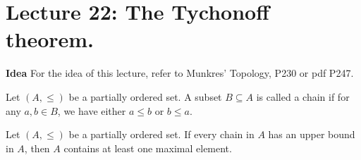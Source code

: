 \documentclass[main.tex]{subfiles}
\begin{document}
\pagestyle{plain}
\setcounter{chapter}{21}

\chapter{Lecture 22: The Tychonoff theorem. }
\label{chap:chapter22}


\par \noindent \textbf{Idea} For the idea of this lecture, refer to Munkres' Topology, P230 or pdf P247. 

\begin{definition}
    Let $(A, \leq)$ be a partially ordered set. A subset $B \subseteq A$ is called a chain if for any $a, b \in B$, we have either $a \leq b$ or $b \leq a$.
\end{definition}


\begin{theorem}
    Let $(A, \leq)$ be a partially ordered set. If every chain in $A$ has an upper bound in $A$, then $A$ contains at least one maximal element.
\end{theorem}
\end{document}
